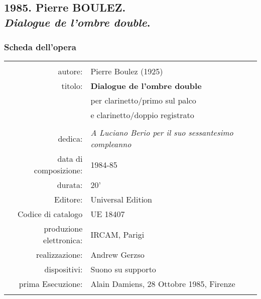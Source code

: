 
\subsection*{1985. Pierre BOULEZ.\\\emph{Dialogue de l'ombre double}.}

\subsubsection*{Scheda dell'opera}

\begin{table}[ht]
\begin{center}
\begin{tabular}{>{\sffamily}r>{\normalsize }p{7.5cm}}

\hline
\hline
											& \\
autore:										& Pierre Boulez (1925) \\
titolo:										& \textbf{Dialogue de l'ombre double} \\
											& \textsf{per clarinetto/primo sul palco} \\
											& \textsf{e clarinetto/doppio registrato} \\
											& \\
dedica:										& \emph{A Luciano Berio per il suo sessantesimo compleanno} \\
data di composizione:						& 1984-85 \\
durata:										& 20' \\
Editore:									& Universal Edition \\
Codice di catalogo							& UE 18407 \\
produzione elettronica:						& IRCAM, Parigi \\
realizzazione:								& Andrew Gerzso \\
dispositivi:								& Suono su supporto \\
prima Esecuzione:							& Alain Damiens, 28 Ottobre 1985, Firenze \\
											& \\
\hline
\hline

\end{tabular}
\end{center}
\end{table}%

